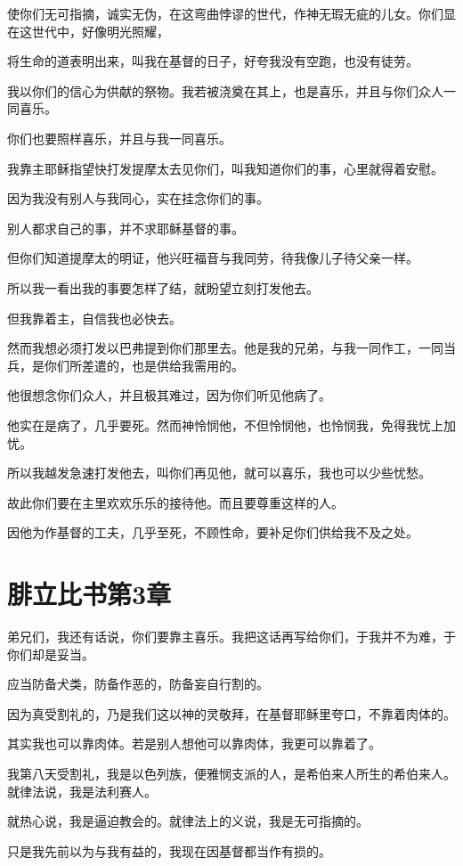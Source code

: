 \documentclass[12pt,oneside]{book}
\begin{document}
使你们无可指摘，诚实无伪，在这弯曲悖谬的世代，作神无瑕无疵的儿女。你们显在这世代中，好像明光照耀，

将生命的道表明出来，叫我在基督的日子，好夸我没有空跑，也没有徒劳。

我以你们的信心为供献的祭物。我若被浇奠在其上，也是喜乐，并且与你们众人一同喜乐。

你们也要照样喜乐，并且与我一同喜乐。

我靠主耶稣指望快打发提摩太去见你们，叫我知道你们的事，心里就得着安慰。

因为我没有别人与我同心，实在挂念你们的事。

别人都求自己的事，并不求耶稣基督的事。

但你们知道提摩太的明证，他兴旺福音与我同劳，待我像儿子待父亲一样。

所以我一看出我的事要怎样了结，就盼望立刻打发他去。

但我靠着主，自信我也必快去。

然而我想必须打发以巴弗提到你们那里去。他是我的兄弟，与我一同作工，一同当兵，是你们所差遣的，也是供给我需用的。

他很想念你们众人，并且极其难过，因为你们听见他病了。

他实在是病了，几乎要死。然而神怜悯他，不但怜悯他，也怜悯我，免得我忧上加忧。

所以我越发急速打发他去，叫你们再见他，就可以喜乐，我也可以少些忧愁。

故此你们要在主里欢欢乐乐的接待他。而且要尊重这样的人。

因他为作基督的工夫，几乎至死，不顾性命，要补足你们供给我不及之处。

\chapter{腓立比书第3章}
弟兄们，我还有话说，你们要靠主喜乐。我把这话再写给你们，于我并不为难，于你们却是妥当。

应当防备犬类，防备作恶的，防备妄自行割的。

因为真受割礼的，乃是我们这以神的灵敬拜，在基督耶稣里夸口，不靠着肉体的。

其实我也可以靠肉体。若是别人想他可以靠肉体，我更可以靠着了。

我第八天受割礼，我是以色列族，便雅悯支派的人，是希伯来人所生的希伯来人。就律法说，我是法利赛人。

就热心说，我是逼迫教会的。就律法上的义说，我是无可指摘的。

只是我先前以为与我有益的，我现在因基督都当作有损的。
\end{document}
